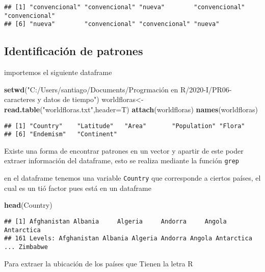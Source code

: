 \documentclass[]{article}
\newenvironment{Shaded}{\begin{snugshade}}{\end{snugshade}}
\newcommand{\KeywordTok}[1]{\textcolor[rgb]{0.13,0.29,0.53}{\textbf{#1}}}
\newcommand{\DataTypeTok}[1]{\textcolor[rgb]{0.13,0.29,0.53}{#1}}
\newcommand{\StringTok}[1]{\textcolor[rgb]{0.31,0.60,0.02}{#1}}
\newcommand{\NormalTok}[1]{#1}
\begin{document}
\begin{verbatim}
## [1] "convencional" "convencional" "nueva"        "convencional" "convencional"
## [6] "nueva"        "convencional" "convencional" "nueva"
\end{verbatim}

\subsection{Identificación de
patrones}\label{identificaciuxf3n-de-patrones}

importemos el siguiente dataframe

\begin{Shaded}
\begin{Highlighting}[]
\KeywordTok{setwd}\NormalTok{(}\StringTok{"C:/Users/santiago/Documents/Progrmación en R/2020-I/PR06-caracteres y datos de tiempo"}\NormalTok{)}
\NormalTok{worldfloras<-}\KeywordTok{read.table}\NormalTok{(}\StringTok{"worldfloras.txt"}\NormalTok{,}\DataTypeTok{header=}\NormalTok{T)}
\KeywordTok{attach}\NormalTok{(worldfloras)}
\KeywordTok{names}\NormalTok{(worldfloras)}
\end{Highlighting}
\end{Shaded}

\begin{verbatim}
## [1] "Country"    "Latitude"   "Area"       "Population" "Flora"     
## [6] "Endemism"   "Continent"
\end{verbatim}

Existe una forma de encontrar patrones en un vector y apartir de este
poder extraer información del dataframe, esto se realiza mediante la
función \texttt{grep}

en el dataframe tenemos una variable \texttt{Country} que corresponde a
ciertos países, el cual es un tió factor pues está en un dataframe

\begin{Shaded}
\begin{Highlighting}[]
\KeywordTok{head}\NormalTok{(Country)}
\end{Highlighting}
\end{Shaded}

\begin{verbatim}
## [1] Afghanistan Albania     Algeria     Andorra     Angola      Antarctica 
## 161 Levels: Afghanistan Albania Algeria Andorra Angola Antarctica ... Zimbabwe
\end{verbatim}

Para extraer la ubicación de los países que Tienen la letra R
\end{document}
